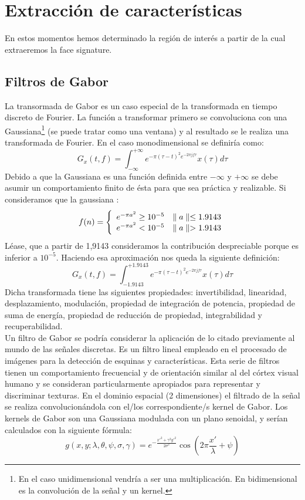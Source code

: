 \section{Extracción de características}
En estos momentos hemos determinado la región de interés a partir de la cual extraeremos la face signature. 
\subsection{Filtros de Gabor}
La transormada de Gabor es un caso especial de la transformada en tiempo discreto de Fourier. La función a transformar primero se convoluciona con una Gaussiana\footnote{En el caso unidimensional vendría a ser una multiplicación. En bidimensional es la convolución de la señal y un kernel.} (se puede tratar como una ventana) y al resultado se le realiza una transformada de Fourier. En el caso monodimensional se definiría como:\\
\[
	G_{x}(t,f)=\int_{-\infty}^{+\infty}{e^{-\pi(\tau-t)^ 2e^{-2\pi jf \tau}}x(\tau)d\tau}
\]
	Debido a que la Gaussiana es una función definida entre $-\infty$ y $+\infty$ se debe asumir un comportamiento finito de ésta para que sea práctica y realizable. Si consideramos que la gaussiana :
\[
f(n) = \left\{ 
\begin{array}{l l}
	e^{-\pi a^2}\geq 10^{-5} & \parallel a \parallel \leq 1.9143 \\
	e^{-\pi a^2} < 10^{-5} & \parallel a \parallel > 1.9143 \\
\end{array} \right.
\]
Léase, que a partir de 1,9143 consideramos la contribución despreciable porque es inferior a $10^{-5}$. Haciendo esa aproximación nos queda la siguiente definición:
\[
	G_{x}(t,f)=\int_{-1.9143}^{+1.9143}{e^{-\pi(\tau-t)^ 2e^{-2\pi jf \tau}}x(\tau)d\tau}
\]
Dicha transformada tiene las siguientes propiedades: invertibilidad, linearidad, desplazamiento, modulación, propiedad de integración de potencia, propiedad de suma de energía, propiedad de reducción de propiedad, integrabilidad y recuperabilidad.\\
Un filtro de Gabor \cite{Lee96imagerepresentation} se podría considerar la aplicación de lo citado previamente al mundo de las señales discretas. Es un filtro lineal empleado en el procesado de imágenes para la detección de esquinas y características. Esta serie de filtros tienen un comportamiento frecuencial y de orientación similar al del córtex visual humano y se consideran particularmente apropiados para representar y discriminar texturas. En el dominio espacial (2 dimensiones) el filtrado de la señal se realiza convolucionándola con el/los correspondiente/s kernel de Gabor. Los kernels de Gabor son una Gaussiana modulada con un plano senoidal, y serían calculados con la siguiente fórmula:
\[
g(x,y;\lambda,\theta,\psi,\sigma,\gamma)=e^{-\frac{x'^2+\gamma^2y'^2}{2\sigma^2}}\cos\left(2\pi\frac{x'}{\lambda}+\psi\right)
\]

